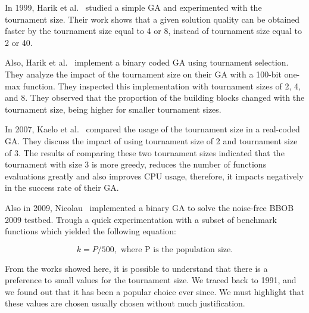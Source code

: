 In 1999, Harik et al.~\cite{harik1999compact} studied a simple GA and experimented with the tournament size. Their work shows that a given solution quality can be obtained faster by the tournament size equal to 4 or 8, instead of tournament size equal to 2 or 40. 

Also, Harik et al.~\cite{harik1999gambler} implement a binary coded GA using tournament selection. They analyze the impact of the tournament size on their GA with a 100-bit one-max function. They inspected this implementation with tournament sizes of 2, 4, and 8. They observed that the proportion of the building blocks changed with the tournament size, being higher for smaller tournament sizes.

In 2007, Kaelo et al.~\cite{kaelo2007integrated} compared the usage of the tournament size in a real-coded GA. They discuss the impact of using tournament size of 2 and tournament size of 3. The results of comparing these two tournament sizes indicated that the tournament with size 3 is more greedy, reduces the number of functions evaluations greatly and also improves CPU usage, therefore, it impacts negatively in the success rate of their GA.


Also in 2009, Nicolau~\cite{nicolau2009application} implemented a binary GA to solve the noise-free BBOB 2009 testbed. Trough a quick experimentation with a subset of benchmark functions which yielded the following equation:

\vspace{-7.5mm}
\begin{equation}
k = P/500, \text{ where P is the population size.}
\end{equation}


From the works showed here, it is possible to understand that there is a preference to small values for the tournament size. We traced back to 1991, and we found out that it has been a popular choice ever since. We must highlight that these values are chosen usually chosen without much justification.




